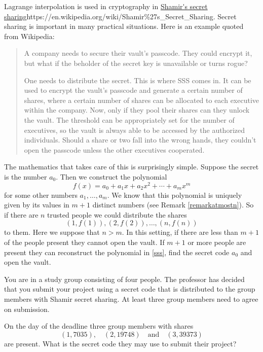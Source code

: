 \documentclass{article}
\begin{document}
Lagrange interpolation is used in cryptography in \url{Shamir's secret sharing}{https://en.wikipedia.org/wiki/Shamir\%27s_Secret_Sharing}. Secret sharing is important in many practical situations. Here is an example quoted from Wikipedia:
  \begin{quote}
    A company needs to secure their vault's passcode. They could
    encrypt it, but what if the beholder of the secret key is
    unavailable or turns rogue?

    One needs to distribute the secret. This is where SSS comes in. It
    can be used to encrypt the vault's passcode and generate a certain
    number of shares, where a certain number of shares can be
    allocated to each executive within the company. Now, only if they
    pool their shares can they unlock the vault. The threshold can be
    appropriately set for the number of executives, so the vault is
    always able to be accessed by the authorized individuals. Should a
    share or two fall into the wrong hands, they couldn't open the
    passcode unless the other executives cooperated.
  \end{quote}

  The mathematics that takes care of this is surprisingly simple. Suppose the secret is the
  number $a_0$. Then we construct the polynomial
  \begin{equation}\label{sss}
  f(x) = a_0 + a_1 x + a_2 x^2 + \cdots + a_m x^m
  \end{equation}
  for some other numbers $a_1, \dots, a_m$.  We know that this
  polynomial is uniquely given by its values in $m+1$ distinct numbers
  (see Remark \ref{remarkatmostn}). So if there are $n$ trusted people
  we could distribute the shares
  $$
  (1, f(1)), (2, f(2)), \dots, (n, f(n))
  $$
  to them. Here we suppose that $n > m$. In this setting, if there are less than $m+1$ of
  the people present they cannot open the vault. If $m+1$ or more people are present they
  can reconstruct the polynomial in \eqref{sss}, find the secret code $a_0$ and open
  the vault.

  \beginshex
  You are in a study group consisting of four people. The
  professor has decided that you submit your project using a
  secret code that is distributed to the group members with Shamir
  secret sharing. At least three group members need to agree on
  submission.

  On the day of the deadline three group members with shares
  $$
  (1, 7035),\quad (2, 19748)\quad\text{and}\quad (3, 39373)
  $$
  are present. What is the secret code they may use to submit their
  project?
  \endshex
\end{document}
